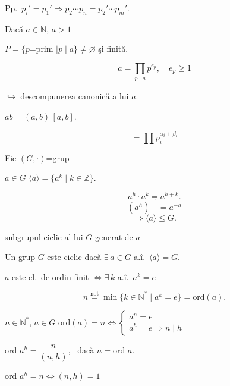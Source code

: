 \documentclass[12pt]{article}
\begin{document}
\noindent Pp.\ $p_i'=p_1' \Rightarrow p_2\cdots p_n = p_2'\cdots p_m'$.

\bigskip
\noindent Dacă $a\in\mathbb{N}$, $a>1$

\noindent $P=\{p$=prim $\mid p\mid a\} \neq \varnothing$ şi finită.

\[
a = \prod_{p\mid a} p^{e_p}, \quad e_p\geq 1
\]

\noindent $\hookrightarrow$ descompunerea canonică a lui $a$.

\bigskip
\noindent\underline{\phantom{xx}}

\noindent $ab = (a,b)\,[a,b]$.

\[
= \prod p_i^{\alpha_i+\beta_i}
\]

\bigskip
\noindent Fie $(G,\cdot)$=grup

\noindent $a\in G$ \quad $\langle a\rangle = \{a^k \mid k\in\mathbb{Z}\}$.

\[
a^h\cdot a^k = a^{h+k}.
\]
\[
(a^h)^{-1} = a^{-h}
\]
\[
\Rightarrow \langle a\rangle \leq G.
\]

\noindent\underline{subgrupul ciclic al lui $G$ generat de $a$}

\bigskip
\noindent Un grup $G$ este \underline{ciclic} dacă $\exists\,a\in G$ a.î.\ $\langle a\rangle = G$.

\bigskip
\noindent $a$ este el.\ de ordin finit $\Leftrightarrow \exists\,k$ a.î.\ $a^k=e$

\[
n \overset{\text{not}}{=} \min\{k\in\mathbb{N}^* \mid a^k=e\} = \text{ord}(a).
\]

\bigskip
\noindent $n\in\mathbb{N}^*$, $a\in G$ \qquad ord$(a)=n \Leftrightarrow \begin{cases}a^n=e\\ a^h=e \Rightarrow n\mid h\end{cases}$

\bigskip
\noindent ord $a^h = \dfrac{n}{(n,h)}$, \ dacă $n=$ord $a$.

\bigskip
\noindent ord $a^h = n \Leftrightarrow (n,h)=1$
\end{document}
